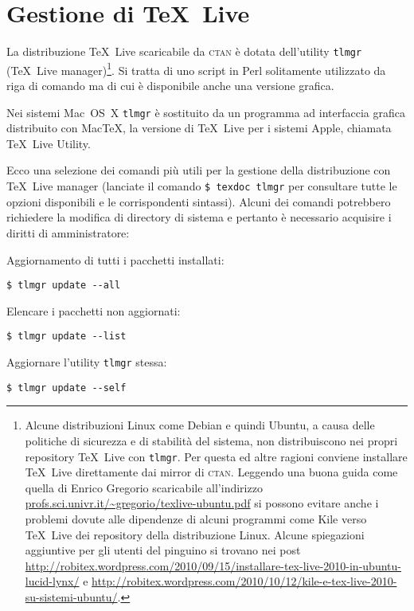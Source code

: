 \section{Gestione di \TeX\ Live}

La distribuzione \TeX\ Live scaricabile da \textsc{ctan} è dotata dell'utility
\texttt{tlmgr} (\TeX\ Live manager)\footnote{Alcune distribuzioni Linux come
Debian e quindi Ubuntu, a causa delle politiche di sicurezza e di stabilità del
sistema, non distribuiscono nei propri repository \TeX\ Live con \texttt{tlmgr}.
Per questa ed altre ragioni conviene installare \TeX\ Live direttamente dai
mirror di \textsc{ctan}. Leggendo una buona guida come quella di Enrico Gregorio
scaricabile all'indirizzo \url{profs.sci.univr.it/~gregorio/texlive-ubuntu.pdf}
si possono evitare anche i problemi dovute alle dipendenze di alcuni programmi
come Kile verso \TeX~Live dei repository della distribuzione Linux. Alcune
spiegazioni aggiuntive per gli utenti del pinguino si trovano nei post
\url{http://robitex.wordpress.com/2010/09/15/installare-tex-live-2010-in-ubuntu-lucid-lynx/}
e
\url{http://robitex.wordpress.com/2010/10/12/kile-e-tex-live-2010-su-sistemi-ubuntu/}.}.
Si tratta di uno script in Perl solitamente utilizzato da riga di comando ma di
cui è disponibile anche una versione grafica.

Nei sistemi Mac~OS~X \texttt{tlmgr} è sostituito da un programma ad interfaccia
grafica distribuito con Mac\TeX, la versione di \TeX\ Live per i sistemi Apple,
chiamata \TeX{}~Live Utility.

Ecco una selezione dei comandi più utili per la gestione della distribuzione con
\TeX{}~Live manager (lanciate il comando \verb=$ texdoc tlmgr= per consultare
tutte le opzioni disponibili e le corrispondenti sintassi). Alcuni dei comandi
potrebbero richiedere la modifica di directory di sistema e pertanto è
necessario acquisire i diritti di amministratore:

Aggiornamento di tutti i pacchetti installati:
\begin{verbatim}
$ tlmgr update --all
\end{verbatim}

Elencare i pacchetti non aggiornati:
\begin{verbatim}
$ tlmgr update --list
\end{verbatim}

Aggiornare l'utility \texttt{tlmgr} stessa:
\begin{verbatim}
$ tlmgr update --self
\end{verbatim}

